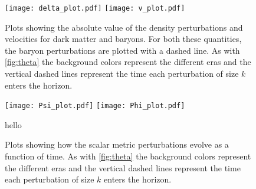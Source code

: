 \documentclass[12pt]{article}
\begin{document}
\begin{figure}[h]
    \centering
    \texttt{[image: delta\_plot.pdf]} 
    \texttt{[image: v\_plot.pdf]} 
    \caption{Plots showing the absolute value of the density perturbations and velocities for dark matter and baryons. For both these quantities, the baryon perturbations are plotted with a dashed line. As with \cref{fig:theta} the background colors represent the different eras and the vertical dashed lines represent the time each perturbation of size $k$ enters the horizon.}
    \label{fig:delta_v}
\end{figure}

\begin{figure}[h]
    \centering
    \texttt{[image: Psi\_plot.pdf]} 
    \texttt{[image: Phi\_plot.pdf]} 
    \caption{hello}
    \label{fig:phi_psi}
    \caption{Plots showing how the scalar metric perturbations evolve as a function of time. As with \cref{fig:theta} the background colors represent the different eras and the vertical dashed lines represent the time each perturbation of size $k$ enters the horizon.}
\end{figure}



{}

\end{document}

